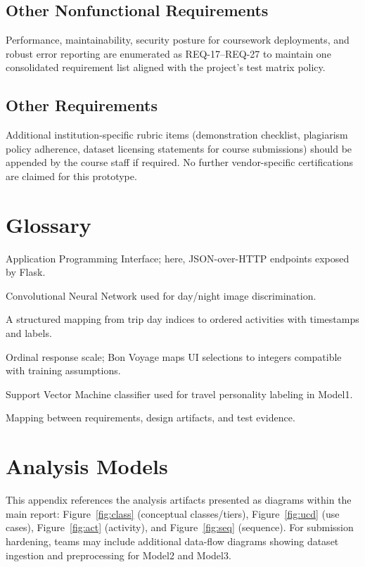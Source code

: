 \documentclass[12pt,oneside,openany]{report}
\begin{document}
\section{Other Nonfunctional Requirements}
Performance, maintainability, security posture for coursework deployments, and robust error reporting are enumerated as REQ-17--REQ-27 to maintain one consolidated requirement list aligned with the project's test matrix policy.

\section{Other Requirements}
Additional institution-specific rubric items (demonstration checklist, plagiarism policy adherence, dataset licensing statements for course submissions) should be appended by the course staff if required. No further vendor-specific certifications are claimed for this prototype.

\appendix
{}

\chapter{Glossary}
\begin{description}[style=nextline,leftmargin=1cm]
\item[API] Application Programming Interface; here, JSON-over-HTTP endpoints exposed by Flask.
\item[CNN] Convolutional Neural Network used for day/night image discrimination.
\item[Itinerary] A structured mapping from trip day indices to ordered activities with timestamps and labels.
\item[Likert scale] Ordinal response scale; Bon Voyage maps UI selections to integers compatible with training assumptions.
\item[SVM] Support Vector Machine classifier used for travel personality labeling in Model1.
\item[Traceability] Mapping between requirements, design artifacts, and test evidence.
\end{description}

\chapter{Analysis Models}
This appendix references the analysis artifacts presented as diagrams within the main report: Figure~\ref{fig:class} (conceptual classes/tiers), Figure~\ref{fig:ucd} (use cases), Figure~\ref{fig:act} (activity), and Figure~\ref{fig:seq} (sequence). For submission hardening, teams may include additional data-flow diagrams showing dataset ingestion and preprocessing for Model2 and Model3.
\end{document}
